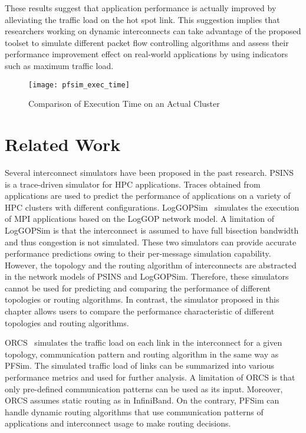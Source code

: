 These results suggest that application performance is actually improved
by alleviating the traffic load on the hot spot link. This suggestion
implies that researchers working on dynamic interconnects can take advantage
of the proposed toolset to simulate different packet flow controlling
algorithms and assess their performance improvement effect on real-world
applications by using indicators such as maximum traffic load.

\begin{figure}
    \centering
    \texttt{[image: pfsim\_exec\_time]}
    \caption{Comparison of Execution Time on an Actual Cluster}%
    \label{fig:cg-nersc-time}
\end{figure}

\section{Related Work}\label{sec:ii-related-work}

Several interconnect simulators have been proposed in the past research.
PSINS~\autocite{Tikir2009} is a trace-driven simulator for HPC
applications. Traces obtained from applications are used to predict the
performance of applications on a variety of HPC clusters with different
configurations. LogGOPSim~\autocite{Hoefler2010} simulates the execution
of MPI applications based on the LogGOP network model. A limitation of
LogGOPSim is that the interconnect is assumed to have full bisection bandwidth
and thus congestion is not simulated. These two simulators can provide
accurate performance predictions owing to their per-message simulation
capability. However, the topology and the routing algorithm of interconnects
are abstracted in the network models of PSINS and LogGOPSim. Therefore, these
simulators cannot be used for predicting and comparing the performance of
different topologies or routing algorithms. In contrast, the simulator
proposed in this chapter allows users to compare the performance
characteristic of different topologies and routing algorithms.

ORCS~\autocite{Schneider2009} simulates the traffic load on each link in
the interconnect for a given topology, communication pattern and routing
algorithm in the same way as PFSim. The simulated traffic load of links can be
summarized into various performance metrics and used for further analysis. A
limitation of ORCS is that only pre-defined communication patterns can be used
as its input. Moreover, ORCS assumes static routing as in InfiniBand. On the
contrary, PFSim can handle dynamic routing algorithms that use communication
patterns of applications and interconnect usage to make routing decisions.

